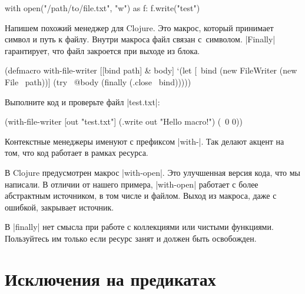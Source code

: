 
\begin{english}
  \begin{python}
with open("/path/to/file.txt", "w") as f:
    f.write("test")
  \end{python}
\end{english}

Напишем похожий менеджер для Clojure. Это макрос, который принимает символ и
путь к файлу. Внутри макроса файл связан с~символом. \spverb|Finally|
гарантирует, что файл закроется при выходе из блока.


\begin{english}
  \begin{clojure}
(defmacro with-file-writer
  [[bind path] & body]
  `(let [~bind (new FileWriter (new File ~path))]
     (try
       ~@body
       (finally
         (.close ~bind)))))
  \end{clojure}
\end{english}

\noindent
Выполните код и проверьте файл \spverb|test.txt|:

\begin{english}
  \begin{clojure}
(with-file-writer [out "test.txt"]
  (.write out "Hello macro!")
  (\ 0 0))
  \end{clojure}
\end{english}

Контекстные менеджеры именуют с префиксом \spverb|with-|. Так делают акцент на
том, что код работает в рамках ресурса.


В Clojure предусмотрен макрос \spverb|with-open|. Это улучшенная версия кода,
что мы написали. В отличии от нашего примера, \spverb|with-open| работает с
более абстрактным источником, в том числе и файлом. Выход из макроса, даже с
ошибкой, закрывает источник.

В \spverb|finally| нет смысла при работе с коллекциями или чистыми
функциями. Пользуйтесь им только если ресурс занят и должен быть освобожден.

\section{Исключения на предикатах}


